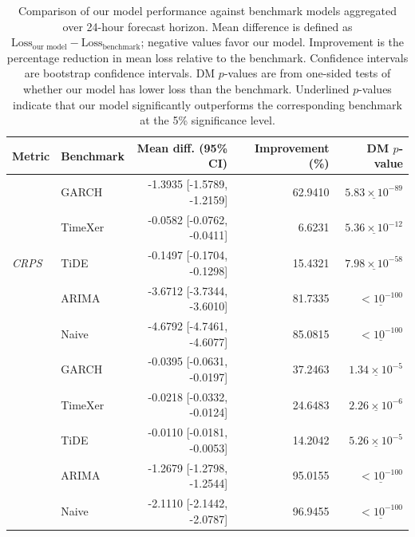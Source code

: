 \documentclass[a4paper,fleqn]{cas-sc}
\begin{document}
\begin{table}[pos=!htbp,align=\centering]
\centering
\caption{Comparison of our model performance against benchmark models aggregated over 24-hour
forecast horizon. Mean difference is defined as
$\mathrm{Loss}_{\text{our model}} - \mathrm{Loss}_{\text{benchmark}}$;
negative values favor our model. Improvement is the percentage reduction in
mean loss relative to the benchmark. Confidence intervals are bootstrap
confidence intervals. DM $p$-values are from one-sided tests of whether our
model has lower loss than the benchmark. Underlined $p$-values indicate that
our model significantly outperforms the corresponding benchmark at the 5\%
significance level.}
\label{tab:model_benchmark_comparison}
\small
\begin{tabular}{llrrr}
\toprule
Metric & Benchmark & Mean diff. (95\% CI) & Improvement (\%) & DM $p$-value \\
\midrule
\multirow{5}{*}{\textit{CRPS}}
 & GARCH & -1.3935 [-1.5789, -1.2159] & 62.9410 & $\underline{5.83 \times 10^{-89}}$ \\
 & TimeXer & -0.0582 [-0.0762, -0.0411] & 6.6231 & $\underline{5.36 \times 10^{-12}}$ \\
 & TiDE & -0.1497 [-0.1704, -0.1298] & 15.4321 & $\underline{7.98 \times 10^{-58}}$ \\
 & ARIMA & -3.6712 [-3.7344, -3.6010] & 81.7335 & $\underline{< 10^{-100}}$ \\
 & Naive & -4.6792 [-4.7461, -4.6077] & 85.0815 & $\underline{< 10^{-100}}$ \\
\addlinespace \midrule
\multirow{5}{*}{\textit{twCRPS}}
 & GARCH & -0.0395 [-0.0631, -0.0197] & 37.2463 & $\underline{1.34 \times 10^{-5}}$ \\
 & TimeXer & -0.0218 [-0.0332, -0.0124] & 24.6483 & $\underline{2.26 \times 10^{-6}}$ \\
 & TiDE & -0.0110 [-0.0181, -0.0053] & 14.2042 & $\underline{5.26 \times 10^{-5}}$ \\
 & ARIMA & -1.2679 [-1.2798, -1.2544] & 95.0155 & $\underline{< 10^{-100}}$ \\
 & Naive & -2.1110 [-2.1442, -2.0787] & 96.9455 & $\underline{< 10^{-100}}$ \\
\bottomrule
\end{tabular}
\end{table}
\end{document}
